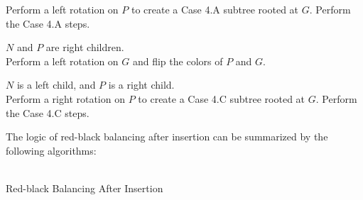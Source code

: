 \begin{description}[1cm]
\begin{description}[1cm]
        Perform a left rotation on $P$ to create a Case 4.A subtree rooted at $G$. Perform the Case 4.A steps. \\
        
        \item[\underline{Case 4.C}:] $N$ and $P$ are right children. \\
        
        Perform a left rotation on $G$ and flip the colors of $P$ and $G$. \\
        
        \item[\underline{Case 4.D}:] $N$ is a left child, and $P$ is a right child. \\
        
        Perform a right rotation on $P$ to create a Case 4.C subtree rooted at $G$. Perform the Case 4.C steps. \\
    \end{description}
\end{description}

The logic of red-black balancing after insertion can be summarized by the following algorithms: \\\\

\begin{algorithm}[H]
    \caption{Red-black Balancing After Insertion}
\end{algorithm}
\vspace{5mm}

